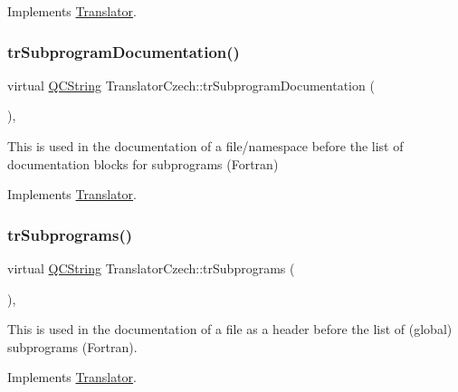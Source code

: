 Implements \mbox{\hyperlink{class_translator}{Translator}}.

\mbox{\label{class_translator_czech_a4c94d14e478f118ff3d46c93d5cbdfe5}} 
\subsubsection{\texorpdfstring{trSubprogramDocumentation()}{trSubprogramDocumentation()}}
{\footnotesize\ttfamily virtual \mbox{\hyperlink{class_q_c_string}{Q\+C\+String}} Translator\+Czech\+::tr\+Subprogram\+Documentation (\begin{DoxyParamCaption}{ }\end{DoxyParamCaption})\hspace{0.3cm}{\ttfamily [inline]}, {\ttfamily [virtual]}}

This is used in the documentation of a file/namespace before the list of documentation blocks for subprograms (Fortran) 

Implements \mbox{\hyperlink{class_translator}{Translator}}.

\mbox{\label{class_translator_czech_abf847aff2abe1d2197bfa9230ca6a124}} 
\subsubsection{\texorpdfstring{trSubprograms()}{trSubprograms()}}
{\footnotesize\ttfamily virtual \mbox{\hyperlink{class_q_c_string}{Q\+C\+String}} Translator\+Czech\+::tr\+Subprograms (\begin{DoxyParamCaption}{ }\end{DoxyParamCaption})\hspace{0.3cm}{\ttfamily [inline]}, {\ttfamily [virtual]}}

This is used in the documentation of a file as a header before the list of (global) subprograms (Fortran). 

Implements \mbox{\hyperlink{class_translator}{Translator}}.

\mbox{\label{class_translator_czech_a9fc761503e57646ae0976e0db403382b}} 
